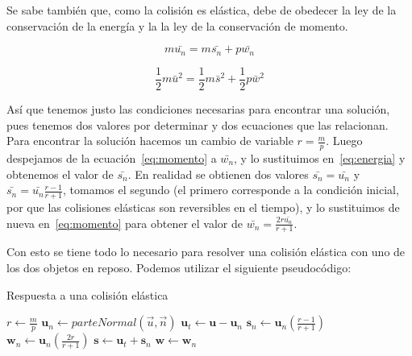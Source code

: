 Se sabe también que, como la colisión es elástica, debe de obedecer la ley de la conservación de la energía y la la ley de la conservación de momento.

\begin{equation}
m \bar{u_n} = m \bar{s_n} + p \bar{w_n}
\label{eq:momento}
\end{equation}

\begin{equation}
\frac{1}{2} m \bar{u}^2 = \frac{1}{2} m \bar{s}^2 + \frac{1}{2} p \bar{w}^2
\label{eq:energia}
\end{equation}

Así que tenemos justo las condiciones necesarias para encontrar una solución, pues tenemos dos valores por determinar y dos ecuaciones que las relacionan. Para encontrar la solución hacemos un cambio de variable $r = \frac{m}{p}$. Luego despejamos de la ecuación~\ref{eq:momento} a $\bar{w_n}$, y lo sustituimos en~\ref{eq:energia} y obtenemos el valor de $\bar{s_n}$. En realidad se obtienen dos valores $\bar{s_n} = \bar{u_n}$ y $\bar{s_n} = \bar{u_n} \frac{r-1}{r+1}$, tomamos el segundo (el primero corresponde a la condición inicial, por que las colisiones elásticas son reversibles en el tiempo), y lo sustituimos de nueva en~\ref{eq:momento} para obtener el valor de $\bar{w_n} = \frac{2 r \bar{u_n}}{r + 1}$.

Con esto se tiene todo lo necesario  para resolver una colisión elástica con uno de los dos objetos en reposo. Podemos utilizar el siguiente pseudocódigo:

{\centering
\begin{minipage}{\linewidth}
  \begin{algorithm}[H]
    \caption{Respuesta a una colisión elástica}
    \label{alg:elas}
    \begin{algorithmic}[1] %
\State $r \gets \frac{m}{p}$
\State $\textbf{u}_n \gets parteNormal(\vec{u}, \vec{n})$
\State $\textbf{u}_t \gets \textbf{u} - \textbf{u}_n$
\State $\textbf{s}_n \gets \textbf{u}_n \left( \frac{r - 1}{r + 1} \right) $
\State $\textbf{w}_n \gets \textbf{u}_n \left( \frac{2r}{r + 1} \right) $
\State $\textbf{s} \gets \textbf{u}_t + \textbf{s}_n$
\State $\textbf{w} \gets \textbf{w}_n$
    \end{algorithmic}
  \end{algorithm}
\end{minipage}
\par
}

